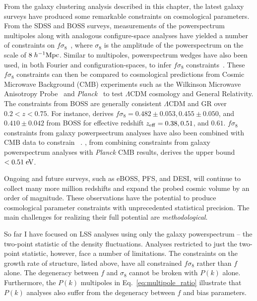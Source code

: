 From the galaxy clustering analysis described in this chapter, the latest 
galaxy surveys have produced some remarkable constraints on cosmological parameters. 
From the SDSS and BOSS surveys, measurements of the powerspectrum multipoles 
along with analogous configure-space analyses have yielded a number of constraints 
on $f\sigma_8$~\citep{Reid:2012aa, Oka:2014aa, Beutler:2014aa, Alam:2015aa, Alam:2016aa, Beutler:2016aa}, 
where $\sigma_8$ 
is the amplitude of the powerspectrum on the scale of $8\;h^{-1}{\rm Mpc}$. 
Similar to multipoles, powerspectrum wedges have also been used, in both 
Fourier and configuration-spaces, to infer $f\sigma_8$ constraints~\citep{Sancehz:2013aa, Sanchez:2016aa, Greib:2016aa}. 
These $f \sigma_8$ constraints can then be compared to cosmological predictions 
from Cosmic Microwave Background (CMB) experiments such as the Wilkinson
Microwave Anisotropy Probe~\citep{WMAP:2013} and {\em Planck}~\citep{Planck:2014aa}
to test $\Lambda$CDM cosmology and General Relativity. 
The constraints from BOSS are generally consistent $\Lambda$CDM and GR over 
$0.2 < z < 0.75$.  For instance, \cite{Beutler:2016aa} derives 
$f\sigma_8 = 0.482 \pm 0.053, 0.455 \pm 0.050$, and $0.410 \pm 0.042$ from BOSS 
for effective redshift $z_{\rm eff} = 0.38, 0.51$, and $0.61$.
$f \sigma_8$ constraints from galaxy powerpsectrum analyses have also been 
combined with CMB data to constrain \mneut~\citep{Zhao:2013aa, Beutler:2014ab, Gil-Marin:2015aa}.
\cite{Beutler:2014ab}, from combining constraints from galaxy powerspectrum 
analyses with {\em Planck} CMB results, derives the upper bound \mneut$ < 0.51\;{\rm eV}$.

Ongoing and future surveys, such as eBOSS, PFS, and DESI, will 
continue to collect many more million redshifts and expand the probed cosmic 
volume by an order of magnitude. These observations have the potential to 
produce cosmological parameter constraints with unprecedented statistical 
precision. The main challenges for realizing their full potential are {\em methodological}.

So far I have focused on LSS analyses using only the galaxy powerspectrum 
-- the two-point statistic of the density fluctuations. Analyses restricted
to just the two-point statistic, however, face a number of limitations. 
The constraints on the growth rate of structure, listed above, have all 
constrained $f \sigma_8$ rather than $f$ alone. The degeneracy 
between $f$ and $\sigma_8$ cannot be broken with $P(k)$ alone. Furthermore, 
the $P(k)$ multipoles in Eq.~\ref{eq:multipole_ratio} illustrate that 
$P(k)$ analyses also suffer from the degeneracy between $f$ and bias 
parameters. 

